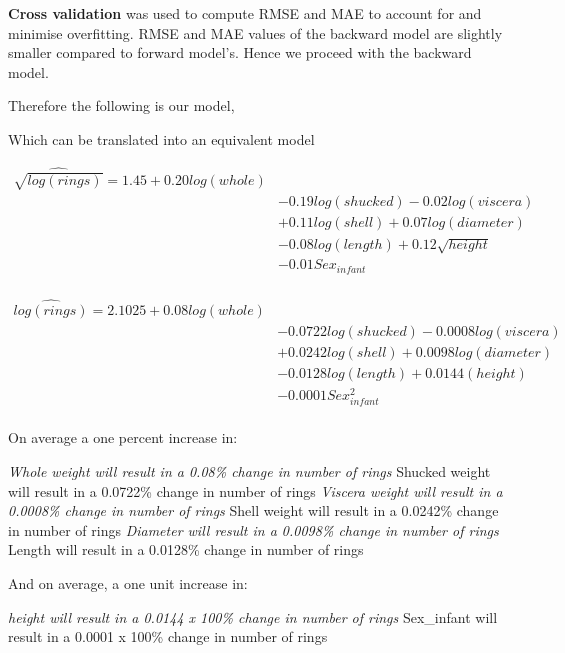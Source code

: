 \documentclass[letterpaper,9pt,twocolumn,twoside,]{pinp}
\begin{document}
\textbf{Cross validation} was used to compute RMSE and MAE to account
for and minimise overfitting. RMSE and MAE values of the backward model
are slightly smaller compared to forward model's. Hence we proceed with
the backward model.

Therefore the following is our model,

Which can be translated into an equivalent model

\begin{equation}
  \begin{aligned}
\widehat{\sqrt{log(rings)}} = 1.45 + 0.20 log(whole)\\
       &- 0.19 log(shucked) - 0.02 log(viscera) \\
       &+ 0.11 log(shell) + 0.07 log(diameter)\\
       &- 0.08 log(length) + 0.12 \sqrt{height}\\
       &- 0.01 Sex_{infant}\\
  \end{aligned}
\end{equation}

\begin{equation}
  \begin{aligned}
\widehat{log(rings)} = 2.1025 + 0.08log(whole)\\
       &- 0.0722 log(shucked) - 0.0008log(viscera) \\
       &+ 0.0242 log(shell) + 0.0098log(diameter)\\
       &- 0.0128 log(length) + 0.0144(height)\\
       &- 0.0001 Sex_{infant}^2\\
  \end{aligned}
\end{equation}

On average a one percent increase in:

\emph{Whole weight will result in a 0.08\% change in number of rings
}Shucked weight will result in a 0.0722\% change in number of rings
\emph{Viscera weight will result in a 0.0008\% change in number of rings
}Shell weight will result in a 0.0242\% change in number of rings
\emph{Diameter will result in a 0.0098\% change in number of rings
}Length will result in a 0.0128\% change in number of rings

And on average, a one unit increase in:

\emph{height will result in a 0.0144 x 100\% change in number of rings
}Sex\_infant will result in a 0.0001 x 100\% change in number of rings
\end{document}
